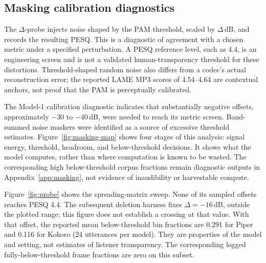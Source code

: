 \documentclass[11pt,a4paper]{article}
\begin{document}
\subsection{Masking calibration diagnostics}
\label{sec:probe}
The $\Delta$-probe injects noise shaped by the PAM threshold, scaled by $\Delta$\,dB, and records the resulting PESQ. This is a diagnostic of agreement with a chosen metric under a specified perturbation. A PESQ reference level, such as 4.4, is an engineering screen and is not a validated human-transparency threshold for these distortions. Threshold-shaped random noise also differs from a codec's actual reconstruction error; the reported LAME MP3 scores of 4.54--4.64 are contextual anchors, not proof that the PAM is perceptually calibrated.

The Model-1 calibration diagnostic indicates that substantially negative offsets, approximately $-30$ to $-40$\,dB, were needed to reach its metric screen. Band-summed noise maskers were identified as a source of excessive threshold estimates. Figure~\ref{fig:masking-map} shows four stages of this analysis: signal energy, threshold, headroom, and below-threshold decisions. It shows what the model computes, rather than where computation is known to be wasted. The corresponding high below-threshold corpus fractions remain diagnostic outputs in Appendix~\ref{app:masking}, not evidence of inaudibility or harvestable compute.

Figure~\ref{fig:probe} shows the spreading-matrix sweep. None of its sampled offsets reaches PESQ 4.4. The subsequent deletion harness fixes $\Delta=-16$\,dB, outside the plotted range; this figure does not establish a crossing at that value. With that offset, the reported mean below-threshold bin fractions are 0.291 for Piper and 0.116 for Kokoro (24 utterances per model). They are properties of the model and setting, not estimates of listener transparency. The corresponding logged fully-below-threshold frame fractions are zero on this subset.
\end{document}
